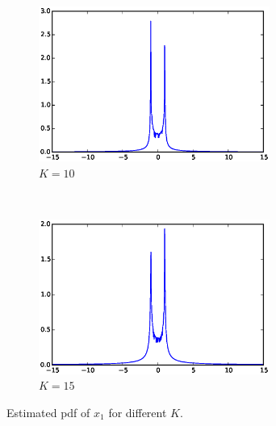 \documentclass[a4paper,12pt]{article}
\begin{document}
\begin{figure}[h]
    \begin{subfigure}[t]{0.5\textwidth}
        \centering
        \includegraphics[height=2in]{figures/knn_x1_10.eps}
        \caption{$K=10$}
    \end{subfigure}%
    ~
    \begin{subfigure}[t]{0.5\textwidth}
        \centering
        \includegraphics[height=2in]{figures/knn_x1_15.eps}
        \caption{$K=15$}
    \end{subfigure}    
    \caption{Estimated pdf of $x_1$ for different $K$.}
\end{figure}
\end{document}
